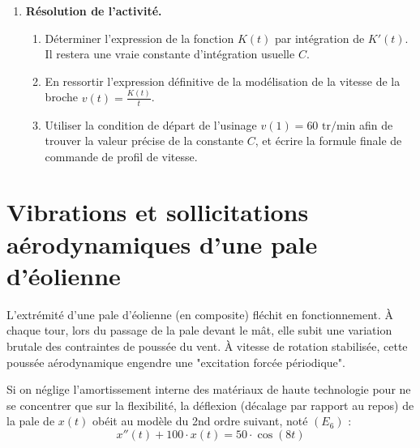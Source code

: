 \documentclass[a4paper,11pt]{article}
\begin{document}
\begin{enumerate}
    \item \textbf{Résolution de l'activité.}
    \begin{enumerate}
        \item Déterminer l'expression de la fonction $K(t)$ par intégration de $K'(t)$. Il restera une vraie constante d'intégration usuelle $C$.
        \vspace{2.5cm}
        \item En ressortir l'expression définitive de la modélisation de la vitesse de la broche $v(t) = \frac{K(t)}{t}$.
        \vspace{3cm}
        \item Utiliser la condition de départ de l'usinage $v(1) = 60 \text{ tr/min}$ afin de trouver la valeur précise de la constante $C$, et écrire la formule finale de commande de profil de vitesse.
        \vspace{4cm}
    \end{enumerate}
\end{enumerate}

\newpage

\section{Vibrations et sollicitations aérodynamiques d'une pale d'éolienne}

L'extrémité d'une pale d'éolienne (en composite) fléchit en fonctionnement. À chaque tour, lors du passage de la pale devant le mât, elle subit une variation brutale des contraintes de poussée du vent. À vitesse de rotation stabilisée, cette poussée aérodynamique engendre une "excitation forcée périodique". 

Si on néglige l'amortissement interne des matériaux de haute technologie pour ne se concentrer que sur la flexibilité, la déflexion (décalage par rapport au repos) de la pale de \textbf{$x(t)$} obéit au modèle du 2nd ordre suivant, noté $(E_6)$ :
\[
x''(t) + 100 \cdot x(t) = 50 \cdot \cos(8t)
\]
\end{document}
